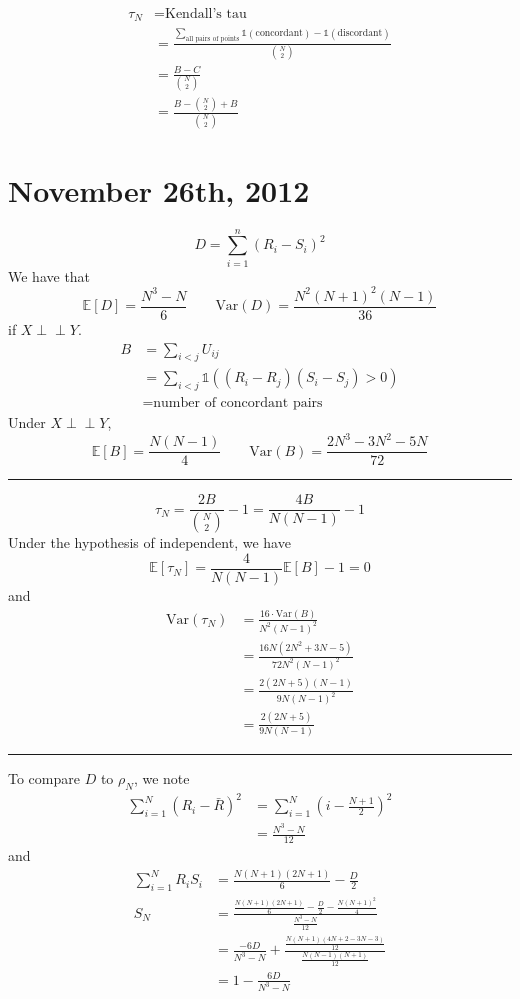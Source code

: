\documentclass[a4paper,12pt]{amsart}
\newcommand{\sumin}{\sum_{i=1}^n}
\newcommand{\sumiN}{\sum_{i=1}^N}
\newcommand{\Var}{\mbox{Var}}
\newcommand{\E}[1]{\mathbb{E}\left[#1\right]}
\newcommand{\indep}{\perp \!\!\! \perp}
\begin{document}
\bigskip

\begin{align*}
\tau_N &= \text{Kendall's tau}\\
&= \frac{\sum_{\text{all pairs of points}} \mathds{1}(\text{concordant}) - \mathds{1}(\text{discordant})}{{N \choose 2}}\\
&= \frac{B-C}{{N \choose 2}}\\
&= \frac{B - {N \choose 2} + B}{{N \choose 2}}
\end{align*}

\section{November 26th, 2012}
\[D = \sumin (R_i - S_i)^2\]
We have that
\[\E{D} = \frac{N^3 - N}{6} \qquad \Var(D) = \frac{N^2(N+1)^2(N-1)}{36}\]
if $X \indep Y$.
\begin{align*}
B &= \sum_{i < j} U_{ij}\\
&=\sum_{i<j} \mathds{1}((R_i - R_j)(S_i - S_j) > 0)\\
&= \text{number of concordant pairs}
\end{align*}
Under $X \indep Y$, 
\[\E{B} = \frac{N(N-1)}{4} \qquad \Var(B) = \frac{2N^3 - 3N^2 - 5N}{72}\]

\bigskip
\hrule
\bigskip
\[\tau_N = \frac{2B}{{N \choose 2}}-1 = \frac{4B}{N(N-1)} - 1\]
Under the hypothesis of independent, we have
\[\E{\tau_N} = \frac{4}{N(N-1)}\E{B} - 1 =0\]
and 
\begin{align*}
\Var(\tau_N) &= \frac{16 \cdot \Var(B)}{N^2(N-1)^2}\\
&= \frac{16N(2N^2 + 3N - 5)}{72 N^2(N-1)^2}\\
&= \frac{2(2N+5)(N-1)}{9N(N-1)^2}\\
&= \frac{2(2N+5)}{9N(N-1)}
\end{align*}

\bigskip
\hrule
\bigskip
To compare $D$ to $\rho_N$, we note
\begin{align*}
\sumiN (R_i - \bar{R})^2 &= \sumiN \left(i - \frac{N+1}{2}\right)^2\\
&= \frac{N^3 - N}{12}
\end{align*}
and
\begin{align*}
\sumiN R_i S_i &= \frac{N(N+1)(2N+1)}{6} - \frac{D}{2}\\
S_N &= \frac{\frac{N(N+1)(2N+1)}{6} - \frac{D}{2} - \frac{N(N+1)^2}{4}}{\frac{N^3-N}{12}}\\
&= \frac{-6D}{N^3 - N} + \frac{\frac{N(N+1)(4N+2-3N-3)}{12}}{\frac{N(N-1)(N+1)}{12}}\\
&= 1 - \frac{6D}{N^3 - N}
\end{align*}
\end{document}
